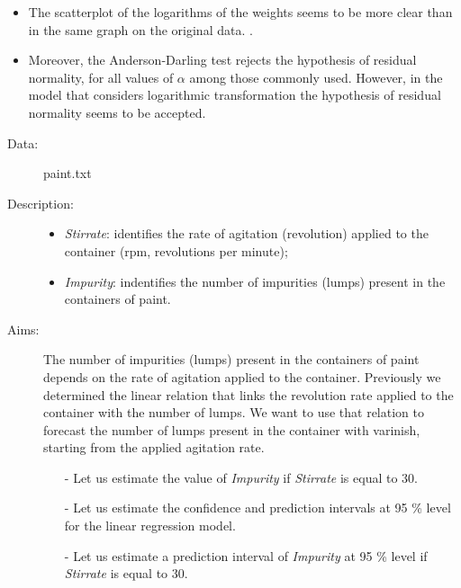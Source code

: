 \begin{frame}
  \vspace{0.75cm}
  \begin{itemize}
    \item The scatterplot of the logarithms of the weights seems to be more clear than in the same graph on the original data. 
.
    \vspace{0.5cm}
    \item Moreover, the Anderson-Darling test rejects the hypothesis of residual normality, for all values of $\alpha$ among those commonly used. However, in the model that considers logarithmic transformation the hypothesis of residual normality seems to be accepted.
  \end{itemize}
\end{frame}





\begin{frame}
  \begin{description}
    \item[Data: ]paint.txt \\ 
    \item[Description: ]
      \begin{footnotesize}
        \begin{itemize}
         \item \textit{Stirrate}: identifies the rate of agitation (revolution) applied to the container (rpm, revolutions per minute);
          \item \textit{Impurity}: indentifies the number of impurities (lumps) present in the containers of paint.
        \end{itemize}
      \end{footnotesize}
    \item[Aims: ]
      \begin{footnotesize}
        The number of impurities (lumps) present in the containers of paint depends on the rate of agitation applied to the container. Previously we determined the linear relation that links the revolution rate applied to the container with the number of lumps. We want to use that relation to forecast the number of lumps present in the container with varinish, starting from the applied agitation rate.
        \begin{itemize}
          \item[-]  Let us estimate the value of \textit{Impurity} if \textit{Stirrate} is equal to 30.
          \item[-]  Let us estimate the confidence and prediction intervals at 95 \% level for the linear regression model.
          \item[-]  Let us estimate a prediction interval of \textit{Impurity} at 95 \% level if \textit{Stirrate} is equal to 30.
        \end{itemize}
      \end{footnotesize}
  \end{description}
\end{frame}

